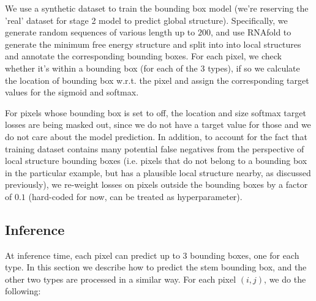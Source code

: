 \documentclass[12pt]{article}
\begin{document}
We use a synthetic dataset to train the bounding box model (we're reserving the 'real' dataset for stage 2 model to predict global structure).
Specifically, we generate random sequences of various length up to $200$, and use RNAfold to generate the
minimum free energy structure and split into into local structures and annotate the corresponding bounding boxes.
For each pixel, we check whether it's within a bounding box (for each of the $3$ types),
if so we calculate the location of bounding box w.r.t. the pixel and assign the corresponding target values for the sigmoid and softmax.

For pixels whose bounding box is set to off, the location and size softmax target losses are being masked out,
since we do not have a target value for those and we do not care about the model prediction.
In addition, to account for the fact that training dataset contains many potential false negatives
from the perspective of local structure bounding boxes
(i.e. pixels that do not belong to a bounding box in the particular example, but has a plausible local structure nearby, as discussed previously),
we re-weight losses on pixels outside the bounding boxes by a factor of $0.1$ (hard-coded for now, can be treated as hyperparameter).



\subsection{Inference} \label{sec:inference}

At inference time, each pixel can predict up to $3$ bounding boxes, one for each type.
In this section we describe how to predict the stem bounding box, and the other two types are processed in a similar way.
For each pixel $(i, j)$, we do the following:
\end{document}
